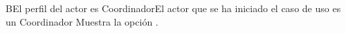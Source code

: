 		\begin{UCtrayectoriaA}{B}{El perfil del actor es Coordinador}{El actor que se ha iniciado el caso de uso es un Coordinador}
			\UCpaso Muestra la opción .  
		\end{UCtrayectoriaA}
    
